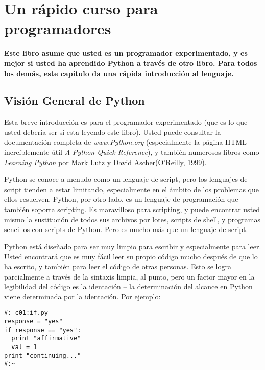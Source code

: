 \section*{Un rápido curso para programadores}
\label{sec:urcpp}

\textbf{Este libro asume que usted es un programador experimentado, y es mejor si usted ha aprendido Python a través de otro libro. Para todos los demás, este capitulo da una rápida introducción al lenguaje.}

\subsection*{Visión General de Python}
\label{subsec:vgpy}

Esta breve introducción es para el programador experimentado (que es lo que usted debería ser si esta leyendo este libro). Usted puede consultar la documentación completa de \textit{www.Python.org} (especialmente la página HTML increíblemente útil \textit{A Python Quick Reference}), y también numerosos libros como \textit{Learning Python} por Mark Lutz y David Ascher(O'Reilly, 1999). \newline

Python se conoce a menudo como un lenguaje de script, pero los lenguajes de script tienden a estar limitando, especialmente en el ámbito de los problemas que ellos resuelven. Python, por otro lado, es un lenguaje de  programación que también soporta scripting. Es maravilloso para scripting, y puede encontrar usted mismo la sustitución de todos sus archivos por lotes, scripts de shell, y programas sencillos con scripts de Python. Pero es mucho más que un lenguaje de script.  \newline

Python está diseñado para ser muy limpio para escribir y especialmente para leer. Usted encontrará que es muy fácil leer su propio código mucho después de que lo ha escrito, y también para leer el código de otras personas. Esto se logra parcialmente a través de la sintaxis limpia, al punto, pero un factor mayor en la legibilidad del código es la identación – la determinación del alcance en Python viene determinada por la identación. Por ejemplo: \newline

\begin{lstlisting} 
#: c01:if.py
response = "yes" 
if response == "yes": 
  print "affirmative" 
  val = 1 
print "continuing..." 
#:~ 
\end{lstlisting}

